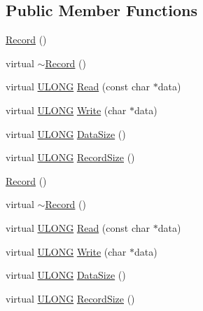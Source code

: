 \subsection*{Public Member Functions}
\begin{DoxyCompactItemize}
\item 
\hyperlink{class_y_excel_1_1_record_abee06ee5b236b6272e1669e81bca2a79}{Record} ()
\item 
virtual \hyperlink{class_y_excel_1_1_record_a58fa39e0271ddb6e174a8585c21daa01}{$\sim$\+Record} ()
\item 
virtual \hyperlink{_basic_excel_8hpp_abe09d1bea023be6a07cbadde8e955435}{U\+L\+O\+N\+G} \hyperlink{class_y_excel_1_1_record_a30e92e50f2e6cc5f01853f8e0789a926}{Read} (const char $\ast$data)
\item 
virtual \hyperlink{_basic_excel_8hpp_abe09d1bea023be6a07cbadde8e955435}{U\+L\+O\+N\+G} \hyperlink{class_y_excel_1_1_record_ab0f4a000eb54ce28447d907884a3f2fe}{Write} (char $\ast$data)
\item 
virtual \hyperlink{_basic_excel_8hpp_abe09d1bea023be6a07cbadde8e955435}{U\+L\+O\+N\+G} \hyperlink{class_y_excel_1_1_record_a5072ade6089352f4d5d396d4bfc7fa11}{Data\+Size} ()
\item 
virtual \hyperlink{_basic_excel_8hpp_abe09d1bea023be6a07cbadde8e955435}{U\+L\+O\+N\+G} \hyperlink{class_y_excel_1_1_record_aa104a4ea2ec94bee04df814476becb03}{Record\+Size} ()
\item 
\hyperlink{class_y_excel_1_1_record_abee06ee5b236b6272e1669e81bca2a79}{Record} ()
\item 
virtual \hyperlink{class_y_excel_1_1_record_aa237852d87a79b3b0cda41c628cf111d}{$\sim$\+Record} ()
\item 
virtual \hyperlink{_basic_excel_8hpp_abe09d1bea023be6a07cbadde8e955435}{U\+L\+O\+N\+G} \hyperlink{class_y_excel_1_1_record_a1d7a0995ea1ad63f91beef5d501c2378}{Read} (const char $\ast$data)
\item 
virtual \hyperlink{_basic_excel_8hpp_abe09d1bea023be6a07cbadde8e955435}{U\+L\+O\+N\+G} \hyperlink{class_y_excel_1_1_record_a40acc5b533a440874d6a8eec88e76cea}{Write} (char $\ast$data)
\item 
virtual \hyperlink{_basic_excel_8hpp_abe09d1bea023be6a07cbadde8e955435}{U\+L\+O\+N\+G} \hyperlink{class_y_excel_1_1_record_aa1c8ae665b9821bc0142745a295a6a45}{Data\+Size} ()
\item 
virtual \hyperlink{_basic_excel_8hpp_abe09d1bea023be6a07cbadde8e955435}{U\+L\+O\+N\+G} \hyperlink{class_y_excel_1_1_record_ac3ebf89e31bce2970946a477a19816f2}{Record\+Size} ()

\end{DoxyCompactItemize}
